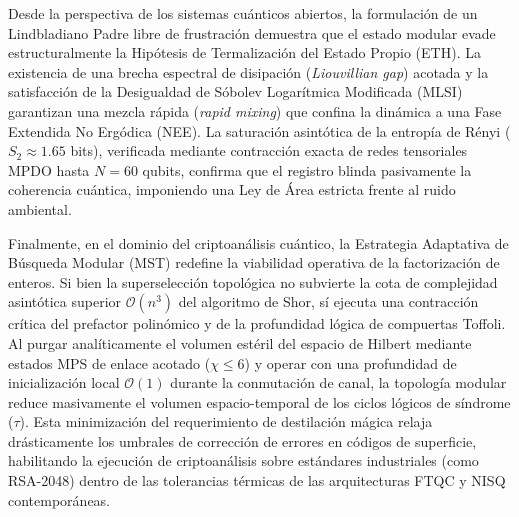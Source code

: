 \documentclass[12pt,a4paper]{article}
\theoremstyle{plain}
\theoremstyle{definition}
\theoremstyle{remark}
\begin{document}
Desde la perspectiva de los sistemas cuánticos abiertos, la formulación de un Lindbladiano Padre libre de frustración demuestra que el estado modular evade estructuralmente la Hipótesis de Termalización del Estado Propio (ETH). La existencia de una brecha espectral de disipación (\textit{Liouvillian gap}) acotada y la satisfacción de la Desigualdad de Sóbolev Logarítmica Modificada (MLSI) garantizan una mezcla rápida (\textit{rapid mixing}) que confina la dinámica a una Fase Extendida No Ergódica (NEE). La saturación asintótica de la entropía de Rényi ($S_2 \approx 1.65$ bits), verificada mediante contracción exacta de redes tensoriales MPDO hasta $N=60$ qubits, confirma que el registro blinda pasivamente la coherencia cuántica, imponiendo una Ley de Área estricta frente al ruido ambiental.

Finalmente, en el dominio del criptoanálisis cuántico, la Estrategia Adaptativa de Búsqueda Modular (MST) redefine la viabilidad operativa de la factorización de enteros. Si bien la superselección topológica no subvierte la cota de complejidad asintótica superior $\mathcal{O}(n^3)$ del algoritmo de Shor, sí ejecuta una contracción crítica del prefactor polinómico y de la profundidad lógica de compuertas Toffoli. Al purgar analíticamente el volumen estéril del espacio de Hilbert mediante estados MPS de enlace acotado ($\chi \le 6$) y operar con una profundidad de inicialización local $\mathcal{O}(1)$ durante la conmutación de canal, la topología modular reduce masivamente el volumen espacio-temporal de los ciclos lógicos de síndrome ($\tau$). Esta minimización del requerimiento de destilación mágica relaja drásticamente los umbrales de corrección de errores en códigos de superficie, habilitando la ejecución de criptoanálisis sobre estándares industriales (como RSA-2048) dentro de las tolerancias térmicas de las arquitecturas FTQC y NISQ contemporáneas.
\end{document}
